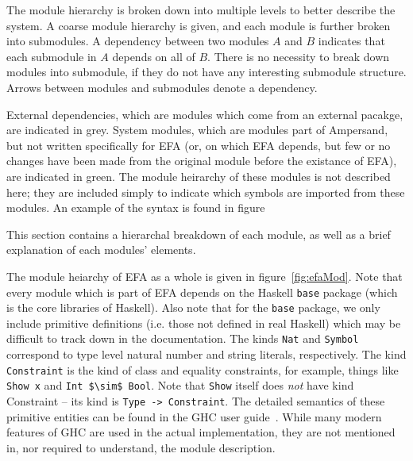 The module hierarchy is broken down into multiple levels to better describe the
system.  A coarse module hierarchy is given, and each module is further broken
into submodules.  A dependency between two modules $A$ and $B$ indicates that
each submodule in $A$ depends on all of $B$. There is no necessity to break
down modules into submodule, if they do not have any interesting submodule 
structure. Arrows between modules and submodules denote a dependency. 

External dependencies, which are modules which come from an external pacakge,
are indicated in {\color{grey}grey}. System modules, which are modules part of
Ampersand, but not written specifically for EFA (or, on which EFA depends, but
few or no changes have been made from the original module before the existance
of EFA), are indicated in {\color{applegreen}green}. The module heirarchy of
these modules is not described here; they are included simply to indicate which
symbols are imported from these modules. An example of the syntax is found in
figure%

This section contains a hierarchal breakdown of each module, as well as a brief
explanation of each modules' elements. 

The module heiarchy of EFA as a whole is given in figure~\ref{fig:efaMod}.  Note
that every module which is part of EFA depends on the Haskell \texttt{base} 
package
(which is the core libraries of Haskell). Also note that for the \texttt{base}
package, we only include primitive definitions (i.e. those not defined in real
Haskell) which may be difficult to track down in the documentation. The kinds
\lstinline{Nat} and \lstinline{Symbol} correspond to type level natural number 
and string
literals, respectively. The kind \lstinline{Constraint} is the kind of class and
equality constraints, for example, things like \lstinline{Show x} and 
\lstinline[mathescape]|Int $\sim$ Bool|.  
Note that \texttt{Show} itself does \emph{not} have kind Constraint --
its kind is \lstinline{Type -> Constraint}. The detailed semantics of these
primitive entities can be found in the GHC user guide~\cite{ghcUserGuide}. While
many modern features of GHC are used in the actual implementation, they are not
mentioned in, nor required to understand, the module description.

